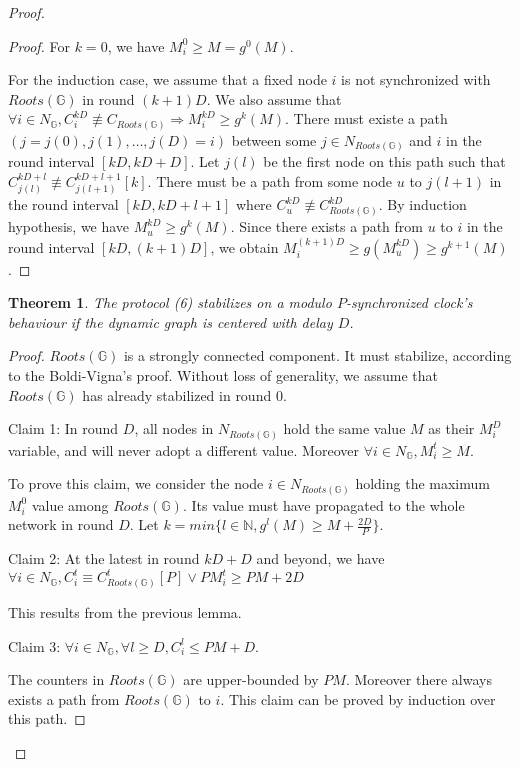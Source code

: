 \documentclass[11pt,letterpaper]{article}
\newtheorem{thm}{Theorem}
\begin{document}
\begin{proof}
\begin{proof}
	For $k = 0$, we have $M^0_i \geq M = g^0(M)$.

	For the induction case, we assume that a fixed node $i$ is not synchronized with $Roots(\mathds{G})$ in round $(k+1)D$.
	We also assume that $\forall i \in N_\mathds{G}, C_i^{kD} \not\equiv C_{Roots(\mathds{G})} \Rightarrow M_i^{kD} \geq g^{k}(M)$.
	There must existe a path $(j = j(0), j(1), \dots, j(D) = i)$ between some $j \in N_{Roots(\mathds{G})}$ and $i$ in the round interval $[kD, kD+D]$.
	Let $j(l)$ be the first node on this path such that $C_{j(l)}^{kD+l} \not\equiv C_{j(l+1)}^{kD+l+1} [k]$.
	There must be a path from some node $u$ to $j(l+1)$ in the round interval $[kD, kD+l+1]$ where $C_u^{kD} \not\equiv C^{kD}_{Roots(\mathds{G})}$.
	By induction hypothesis, we have $M_u^{kD} \geq g^{k}(M)$.
	Since there exists a path from $u$ to $i$ in the round interval $[kD, (k+1)D]$,
	we obtain $M_i^{(k+1)D} \geq g(M_u^{kD}) \geq g^{k+1}(M)$.
\end{proof}

\begin{thm}
	The protocol (6) stabilizes on a modulo $P$-synchronized clock's behaviour if the dynamic graph is centered with delay $D$.
\end{thm}
\begin{proof}
	\noindent $Roots(\mathds{G})$ is a strongly connected component. It must stabilize, according to the Boldi-Vigna's proof.
	Without loss of generality, we assume that $Roots(\mathds{G})$ has already stabilized in round 0.

	\noindent Claim 1: In round $D$, all nodes in $N_{Roots(\mathds{G})}$ hold the same value $M$ as their $M_i^D$ variable, and will never adopt a different value.
	Moreover $\forall i \in N_\mathds{G}, M_i^t \geq M$.

	\noindent To prove this claim, we consider the node $i \in N_{Roots(\mathds{G})}$ holding the maximum $M_i^0$ value among $Roots(\mathds{G})$.
	Its value must have propagated to the whole network in round $D$.
	Let $k = min \{l \in \mathds{N}, g^l(M) \geq M+\frac{2D}{P}\}$.

	\noindent Claim 2: At the latest in round $kD+D$ and beyond, we have $\forall i \in N_\mathds{G}, C_i^t \equiv C_{Roots(\mathds{G})}^t [P] \vee PM_i^t \geq PM+2D$

	\noindent This results from the previous lemma.

	\noindent Claim 3: $\forall i \in N_\mathds{G}, \forall l \geq D, C_i^l \leq PM+D$.

	\noindent The counters in $Roots(\mathds{G})$ are upper-bounded by $PM$.
	Moreover there always exists a path from $Roots(\mathds{G})$ to $i$.
	This claim can be proved by induction over this path.


\end{proof}
\end{proof}
\end{document}
